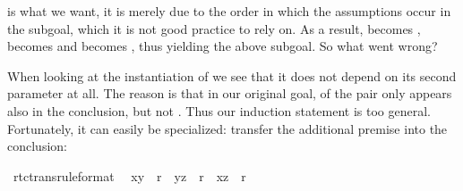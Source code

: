 \begin{isabellebody}
\begin{isamarkuptxt}
is what we want, it is merely due to the order in which the assumptions occur
in the subgoal, which it is not good practice to rely on. As a result,
 becomes ,  becomes
 and  becomes , thus
yielding the above subgoal. So what went wrong?

When looking at the instantiation of  we see that it does not
depend on its second parameter at all. The reason is that in our original
goal, of the pair  only  appears also in the
conclusion, but not . Thus our induction statement is too
general. Fortunately, it can easily be specialized:
transfer the additional premise  into the conclusion:%
\end{isamarkuptxt}%
\isamarkuptrue%
%
\endisatagproof
{\isafoldproof}%
%
\isadelimproof
%
\endisadelimproof
{}\isamarkupfalse%
\ rtc{}trans{}rule{}format{}{}\isanewline
\ \ {}{}x{}y{}\ {}\ r{}\ {}\ {}y{}z{}\ {}\ r{}\ {}\ {}x{}z{}\ {}\ r{}{}%
\isadelimproof
%
\endisadelimproof

\end{isabellebody}

